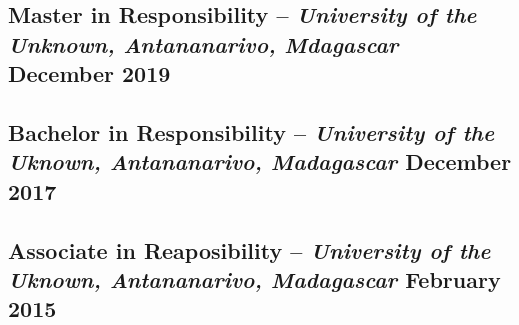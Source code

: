 

\begin{samepage}
    \nopagebreak

    
    \subsection*{\textbf{Master in Responsibility} -- \textit{University of the Unknown, Antananarivo, Mdagascar} \hfill December 2019}

        
    \subsection*{\textbf{Bachelor in Responsibility} -- \textit{University of the Uknown, Antananarivo, Madagascar} \hfill December 2017}

        
    \subsection*{\textbf{Associate in Reaposibility} -- \textit{University of the Uknown, Antananarivo, Madagascar} \hfill February 2015}

        
\end{samepage}
